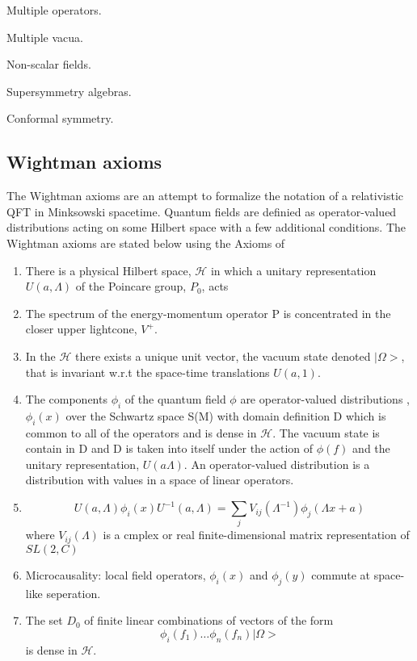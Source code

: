 \documentclass{article}
\newcommand{\1}{\mathbbm{1}}
\theoremstyle{plain}
\theoremstyle{definition}
\numberwithin{equation}{section}
\begin{document}
Multiple operators.

Multiple vacua.

Non-scalar fields.

Supersymmetry algebras.

Conformal symmetry.

\subsection{Wightman axioms}\label{wightmanaxioms}

The Wightman axioms are an attempt to formalize the notation of a relativistic QFT in Minksowski spacetime. Quantum fields are definied as operator-valued distributions acting on some Hilbert space with a few additional conditions. The Wightman axioms are stated below using the Axioms of \cite{https://ncatlab.org/nlab/show/Wightman+axioms}

\begin{enumerate}
    \item There is a physical Hilbert space, $\mathcal{H}$ in which a unitary representation $U(a, \Lambda)$ of the Poincare group,  $P_0$,  acts
    \item The spectrum of the energy-momentum operator P is concentrated in the closer upper lightcone, $V^+$. 
    \item In the $\mathcal{H}$ there exists a unique unit vector, the vacuum state denoted $|\Omega>$, that is invariant w.r.t the space-time translations $U(a,1)$.
    \item The components $\phi_i$ of the quantum field $ \phi$ are operator-valued distributions , $\phi_i(x)$ over the Schwartz space S(M) with domain definition D which is common to all of the operators and is dense in $\mathcal{H}$. The vacuum state is contain in D and D is taken into itself under the action of $\phi(f)$ and the unitary representation, $U(a\Lambda)$. An operator-valued distribution is a distribution with values in a space of linear operators. 
    \item \begin{equation}
        U(a, \Lambda) \phi_i(x) U^{-1}(a, \Lambda)= \sum_j V_{ij} (\Lambda^{-1}) \phi_j(\Lambda x + a)
    \end{equation}
    where $V_{ij}(\Lambda)$ is a cmplex or real finite-dimensional matrix representation of $SL(2,C)$
    \item Microcausality: local field operators, $\phi_i(x)$ and $\phi_j(y)$ commute at space-like seperation. 
    \item The set $D_0$ of finite linear combinations of vectors of the form 
    \begin{equation}
        \phi_i(f_1) \ldots \phi_n(f_n) |\Omega>
    \end{equation}
    is dense in $\mathcal{H}$. 
\end{enumerate}
\end{document}
